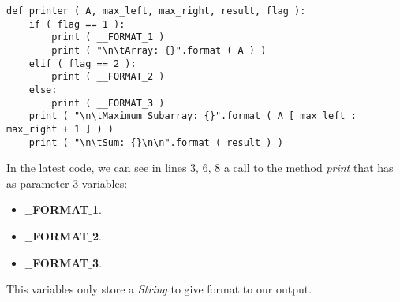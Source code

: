 \begin{lstlisting}
def printer ( A, max_left, max_right, result, flag ):
    if ( flag == 1 ):
        print ( __FORMAT_1 )
        print ( "\n\tArray: {}".format ( A ) )
    elif ( flag == 2 ):
        print ( __FORMAT_2 )
    else:
        print ( __FORMAT_3 )
    print ( "\n\tMaximum Subarray: {}".format ( A [ max_left : max_right + 1 ] ) )
    print ( "\n\tSum: {}\n\n".format ( result ) )
\end{lstlisting} \hfill

In the latest code, we can see in lines 3, 6, 8 a call to the method {\itshape print} that has as parameter 3 variables:

\begin{itemize}
\item {\bfseries $\_\_$FORMAT$\_$1}.
\item {\bfseries $\_\_$FORMAT$\_$2}.
\item {\bfseries $\_\_$FORMAT$\_$3}.
\end{itemize}

This variables only store a {\itshape String} to give format to our output.

\pagebreak